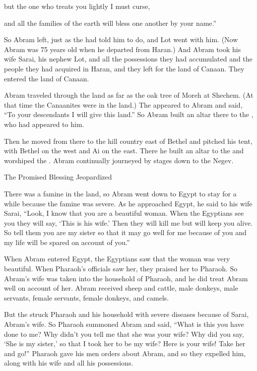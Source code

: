 {\par }{\Q but the one who treats
you lightly
I must curse,
\par }{\Q and all
the families
of the earth
will bless one another by your name.”
\par }{\PP {}So
Abram
left, just
as the
{}
had told
him
to do, and Lot
went
with
him. (Now Abram
was 75
years
old
when
he departed
from Haran.)
And Abram
took
his wife
Sarai,
his nephew
Lot,
and all
the possessions
they had
accumulated
and the people they had
acquired
in Haran,
and they left
for the land
of Canaan.
They entered
the land
of Canaan.
\par }{\PP {}Abram
traveled
through the land
as far
as the oak tree
of Moreh
at Shechem.
(At that time
the Canaanites
were in the land.)
The
{}
appeared
to
Abram
and said,
“To your descendants
I will give
this
land.”
So Abram built
an altar
there
to the
{},
who had appeared
to him.
\par }{\PP {}Then he moved
from there
to the hill country
east
of Bethel
and pitched
his tent,
with Bethel
on the west
and Ai
on the east.
There
he built
an altar
to the
{}
and worshiped
the {}.
Abram
continually journeyed
by stages
down to the Negev.
\par }{\SH The Promised Blessing Jeopardized
\par }{\PP {}There was
a famine
in the land,
so Abram
went down
to Egypt
to stay
for a
while because
the famine
was severe.
As he approached
Egypt,
he said
to
his wife
Sarai,
“Look,
I know
that
you
are a beautiful
woman.
When
the Egyptians
see
you they will say,
‘This
is his wife.’
Then they will kill
me but will keep you alive.
So
tell
them you
are my sister
so that it may
go well
for me because
of you and my life
will be spared
on account of you.”
\par }{\PP {}When
Abram
entered
Egypt,
the Egyptians
saw
that the woman
was very
beautiful.
When
Pharaoh’s
officials
saw her, they praised
her to
Pharaoh.
So Abram’s
wife
was taken
into the household
of Pharaoh,
and he did treat
Abram
well
on account of
her. Abram received
sheep
and cattle,
male donkeys,
male servants,
female servants,
female donkeys,
and camels.
\par }{\PP {}But the
{}
struck
Pharaoh
and his household
with severe
diseases
because of Sarai,
Abram’s
wife.
So Pharaoh
summoned
Abram
and said,
“What
is this
you have done
to me? Why
didn’t
you tell
me that
she was
your wife?
Why
did you say,
‘She is my sister,’
so that I took
her to be my wife? Here
is your wife! Take
her and go!”
Pharaoh
gave his men
orders
about Abram, and so they expelled
him, along
with his wife
and all
his possessions.

}
